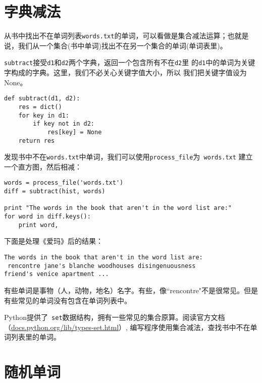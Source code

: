 \section{字典减法}

从书中找出不在单词列表{\tt words.txt}的单词，可以看做是集合减法运算；也就是
说，我们从一个集合(书中单词)找出不在另一个集合的单词(单词表里)。

{\tt subtract}接受{\tt d1}和{\tt d2}两个字典，返回一个包含所有不在{\tt d2}里
的{\tt d1}中的单词为关键字构成的字典。这里，我们不必关心关键字值大小，所以
我们把关键字值设为None。

\beforeverb
\begin{verbatim}
def subtract(d1, d2):
    res = dict()
    for key in d1:
        if key not in d2:
            res[key] = None
    return res
\end{verbatim}
\afterverb

发现书中不在{\tt words.txt}中单词，我们可以使用\verb"process_file"为{\tt
	words.txt}
	建立一个直方图，然后相减：

\beforeverb
\begin{verbatim}
words = process_file('words.txt')
diff = subtract(hist, words)

print "The words in the book that aren't in the word list are:"
for word in diff.keys():
    print word,
\end{verbatim}
\afterverb

下面是处理《爱玛》后的结果：

\beforeverb
\begin{verbatim}
The words in the book that aren't in the word list are:
 rencontre jane's blanche woodhouses disingenuousness 
friend's venice apartment ...
\end{verbatim}
\afterverb

有些单词是事物（人，动物，地名）名字。有些，像“rencontre"不是很常见。但是
有些常见的单词没有包含在单词列表中。

\begin{ex}


Python提供了{\tt
	set}数据结构，拥有一些常见的集合原算。阅读官方文档（\url{docs.python.org/lib/types-set.html}）,
	编写程序使用集合减法，查找书中不在单词列表里的单词。

\end{ex}



\section{随机单词}
\label{randomwords}


